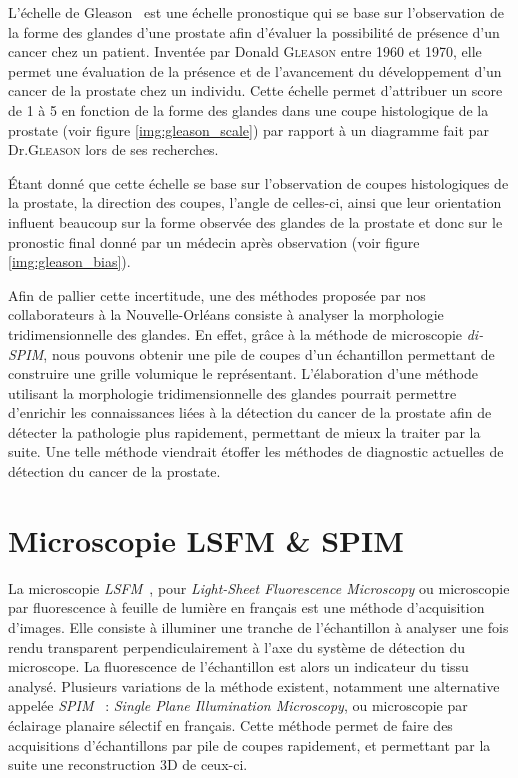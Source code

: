 {{		L'échelle de Gleason~\cite{cite_gleason_score} est une échelle pronostique qui se base sur l'observation de la forme des glandes d'une prostate afin d'évaluer la possibilité de présence d'un cancer chez un patient. Inventée par Donald \textsc{Gleason} entre 1960 et 1970, elle permet une évaluation de la présence et de l'avancement du développement d'un cancer de la prostate chez un individu. Cette échelle permet d'attribuer un score de 1 à 5 en fonction de la forme des glandes dans une coupe histologique de la prostate (voir figure \ref{img:gleason_scale}) par rapport à un diagramme fait par Dr.\textsc{Gleason} lors de ses recherches.

		Étant donné que cette échelle se base sur l'observation de coupes histologiques de la prostate, la direction des coupes, l'angle de celles-ci, ainsi que leur orientation influent beaucoup sur la forme observée des glandes de la prostate et donc sur le pronostic final donné par un médecin après observation (voir figure \ref{img:gleason_bias}).

		Afin de pallier cette incertitude, une des méthodes proposée par nos collaborateurs à la Nouvelle-Orléans consiste à analyser la morphologie tridimensionnelle des glandes. En effet, grâce à la méthode de microscopie \textit{di-SPIM}, nous pouvons obtenir une pile de coupes d'un échantillon permettant de construire une grille volumique le représentant. L'élaboration d'une méthode utilisant la morphologie tridimensionnelle des glandes pourrait permettre d'enrichir les connaissances liées à la détection du cancer de la prostate afin de détecter la pathologie plus rapidement, permettant de mieux la traiter par la suite. Une telle méthode viendrait étoffer les méthodes de diagnostic actuelles de détection du cancer de la prostate.
	}

	\section{Microscopie LSFM \& SPIM}\label{section:microscopy}
	{
		La microscopie \textit{LSFM}~\cite{cite_lsfm_explication_girard}, pour \textit{Light-Sheet Fluorescence Microscopy} ou microscopie par fluorescence à feuille de lumière en français est une méthode d'acquisition d'images. Elle consiste à illuminer une tranche de l'échantillon à analyser une fois rendu transparent perpendiculairement à l'axe du système de détection du microscope. La fluorescence de l'échantillon est alors un indicateur du tissu analysé. Plusieurs variations de la méthode existent, notamment une alternative appelée \textit{SPIM}~\cite{cite_spim_explication_original} : \textit{Single Plane Illumination Microscopy}, ou microscopie par éclairage planaire sélectif en français. Cette méthode permet de faire des acquisitions d'échantillons par pile de coupes rapidement, et permettant par la suite une reconstruction 3D de ceux-ci.

}}
